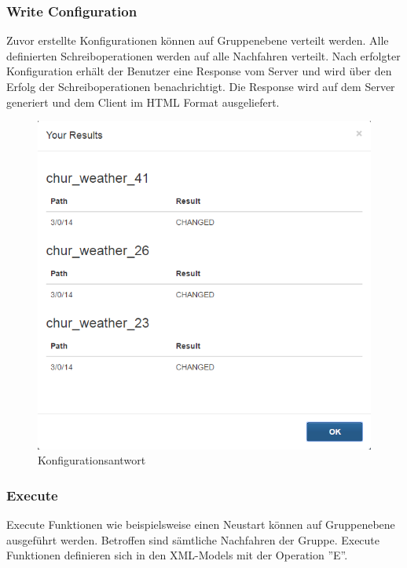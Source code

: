 \subsubsection{Write Configuration}
Zuvor erstellte Konfigurationen können auf Gruppenebene verteilt werden. Alle definierten Schreiboperationen werden auf alle Nachfahren verteilt. Nach erfolgter Konfiguration erhält der Benutzer eine Response vom Server und wird über den Erfolg der Schreiboperationen benachrichtigt. Die Response wird auf dem Server generiert und dem Client im HTML Format ausgeliefert.

\begin{figure}[H]
\centering
\includegraphics[scale=0.6]{../04_Realisierung/images/userinterface/configresults.png}
\caption{Konfigurationsantwort}
\end{figure}

\subsubsection{Execute}
Execute Funktionen wie beispielsweise einen Neustart können auf Gruppenebene ausgeführt werden. Betroffen sind sämtliche Nachfahren der Gruppe. Execute Funktionen definieren sich in den XML-Models mit der Operation ''E''.

